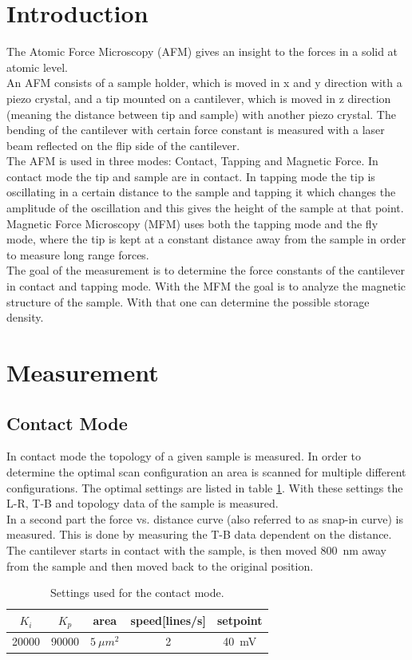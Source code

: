 \documentclass[%
 reprint,
amsmath,amssymb,
pra,
]{revtex4-1}
\begin{document}
\section{Introduction}
The Atomic Force Microscopy (AFM) gives an insight to the forces in a solid at atomic level. \\
An AFM consists of a sample holder, which is moved in x and y direction with a piezo crystal, and a tip mounted on a cantilever, which is moved in z direction (meaning the distance between tip and sample) with another piezo crystal. The bending of the cantilever with certain force constant is measured with a laser beam reflected on the flip side of the cantilever. \\
The AFM is used in three modes: Contact, Tapping and Magnetic Force. In contact mode the tip and sample are in contact. In tapping mode the tip is oscillating in a certain distance to the sample and tapping it which changes the amplitude of the oscillation and this gives the height of the sample at that point. Magnetic Force Microscopy (MFM) uses both the tapping mode and the fly mode, where the tip is kept at a constant distance away from the sample in order to measure long range forces. \\
The goal of the measurement is to determine the force constants of the cantilever in contact and tapping mode. With the MFM the goal is to analyze the magnetic structure of the sample. With that one can determine the possible storage density.


\section{Measurement}
\subsection{Contact Mode}
In contact mode the topology of a given sample is measured. In order to determine the optimal scan configuration an area is scanned for multiple different configurations. The optimal settings are listed in table \ref{tab:contact_settings}. With these settings the L-R, T-B and topology data of the sample is measured.\\
In a second part the force vs. distance curve (also referred to as snap-in curve) is measured. This is done by measuring the T-B data dependent on the distance. The cantilever starts in contact with the sample, is then moved \SI{800}{nm} away from the sample and then moved back to the original position.
\begin{table}[h]
\centering
\begin{tabular}{|c|c|c|c|c|}
\hline 
$K_i$ & $K_p$ & area & speed[lines/s] & setpoint\\ 
\hline 
20000 & 90000 & $\SI{5}{\mu m^2}$ & 2 & \SI{40}{mV}\\ 
\hline 
\end{tabular} 
\caption{Settings used for the contact mode.}
\label{tab:contact_settings}
\end{table}
\end{document}
